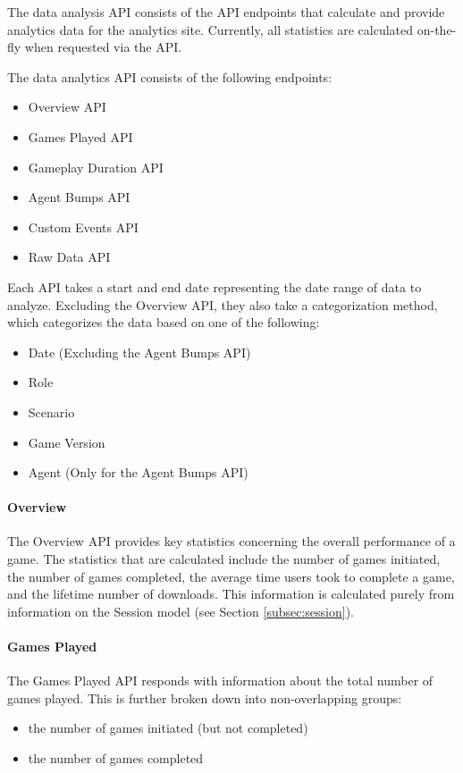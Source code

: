 The data analysis API consists of the API endpoints that calculate and provide analytics data for the analytics site. Currently, all statistics are calculated on-the-fly when requested via the API. 

\pagebreak
The data analytics API consists of the following endpoints:

	\begin{itemize}
		\item Overview API
		\item Games Played API
		\item Gameplay Duration API
		\item Agent Bumps API
		\item Custom Events API
		\item Raw Data API
	\end{itemize}

Each API takes a start and end date representing the date range of data to analyze. Excluding the Overview API, they also take a categorization method, which categorizes the data based on one of the following:
	\begin{itemize}
		\item Date (Excluding the Agent Bumps API)
		\item Role
		\item Scenario
		\item Game Version
		\item Agent (Only for the Agent Bumps API)
	\end{itemize}

\paragraph{Overview}

The Overview API provides key statistics concerning the overall performance of a game. The statistics that are calculated include the number of games initiated, the number of games completed, the average time users took to complete a game, and the lifetime number of downloads. This information is calculated purely from information on the Session model (see Section \ref{subsec:session}).

\paragraph{Games Played}

The Games Played API responds with information about the total number of games played. This is further broken down into non-overlapping groups:
	\begin{itemize}
		\item the number of games initiated (but not completed)
		\item the number of games completed
	\end{itemize}

